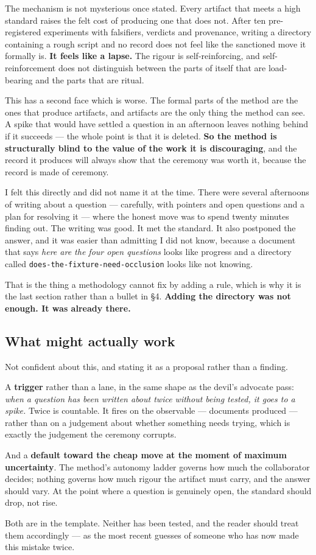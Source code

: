 The mechanism is not mysterious once stated. Every artifact that meets a high standard raises the felt cost of producing one that does not. After ten pre-registered experiments with falsifiers, verdicts and provenance, writing a directory containing a rough script and no record does not feel like the sanctioned move it formally is. \textbf{It feels like a lapse.} The rigour is self-reinforcing, and self-reinforcement does not distinguish between the parts of itself that are load-bearing and the parts that are ritual.

This has a second face which is worse. The formal parts of the method are the ones that produce artifacts, and artifacts are the only thing the method can see. A spike that would have settled a question in an afternoon leaves nothing behind if it succeeds --- the whole point is that it is deleted. \textbf{So the method is structurally blind to the value of the work it is discouraging}, and the record it produces will always show that the ceremony was worth it, because the record is made of ceremony.

I felt this directly and did not name it at the time. There were several afternoons of writing about a question --- carefully, with pointers and open questions and a plan for resolving it --- where the honest move was to spend twenty minutes finding out. The writing was good. It met the standard. It also postponed the answer, and it was easier than admitting I did not know, because a document that says \textit{here are the four open questions} looks like progress and a directory called \texttt{does-the-fixture-need-occlusion} looks like not knowing.

That is the thing a methodology cannot fix by adding a rule, which is why it is the last section rather than a bullet in \S4. \textbf{Adding the directory was not enough. It was already there.}

\subsection{What might actually work}

Not confident about this, and stating it as a proposal rather than a finding.

A \textbf{trigger} rather than a lane, in the same shape as the devil's advocate pass: \textit{when a question has been written about twice without being tested, it goes to a spike.} Twice is countable. It fires on the observable --- documents produced --- rather than on a judgement about whether something needs trying, which is exactly the judgement the ceremony corrupts.

And a \textbf{default toward the cheap move at the moment of maximum uncertainty}. The method's autonomy ladder governs how much the collaborator decides; nothing governs how much rigour the artifact must carry, and the answer should vary. At the point where a question is genuinely open, the standard should drop, not rise.

Both are in the template. Neither has been tested, and the reader should treat them accordingly --- as the most recent guesses of someone who has now made this mistake twice.
